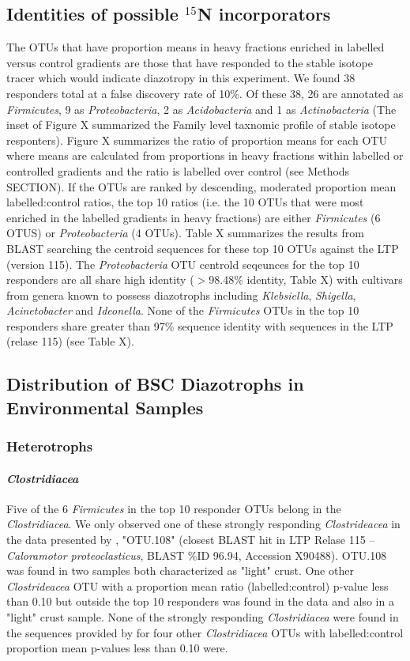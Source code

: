 \subsection{Identities of possible $^{15}$N incorporators}
The OTUs that have proportion means in heavy fractions enriched in labelled versus control gradients are those that have responded to the stable isotope tracer which would indicate diazotropy in this experiment. We found 38 responders total at a false discovery rate of 10\%. Of these 38, 26 are annotated as \textit{Firmicutes}, 9 as \textit{Proteobacteria}, 2 as \textit{Acidobacteria} and 1 as \textit{Actinobacteria} (The inset of Figure X summarized the Family level taxnomic profile of stable isotope responters). Figure X summarizes the ratio of proportion means for each OTU where means are calculated from proportions in heavy fractions within labelled or controlled gradients and the ratio is labelled over control (see Methods SECTION). If the OTUs are ranked by descending, moderated proportion mean labelled:control ratios, the top 10 ratios (i.e. the 10 OTUs that were most enriched in the labelled gradients in heavy fractions) are either \textit{Firmicutes} (6 OTUS) or \textit{Proteobacteria} (4 OTUs). Table X summarizes the results from BLAST searching the centroid sequences for these top 10 OTUs against the LTP (version 115). The \textit{Proteobacteria} OTU centrold seqeunces for the top 10 responders are all share high identity ($>$98.48\% identity, Table X) with cultivars from genera known to possess diazotrophs including \textit{Klebsiella}, \textit{Shigella}, \textit{Acinetobacter} and \textit{Ideonella}. None of the \textit{Firmicutes} OTUs in the top 10 responders share greater than 97\% sequence identity with sequences in the LTP (relase 115) (see Table X).

\subsection{Distribution of BSC Diazotrophs in Environmental Samples}
\subsubsection{Heterotrophs}
\paragraph{\textit{Clostridiacea}}
Five of the 6 \textit{Firmicutes} in the top 10 responder OTUs belong in the \textit{Clostridiacea}. We only observed one of these strongly responding \textit{Clostrideacea} in the data presented by \citet{Garcia_Pichel_2013}, "OTU.108" (closest BLAST hit in LTP Relase 115 -- \textit{Caloramotor proteoclasticus}, BLAST \%ID 96.94, Accession X90488). OTU.108 was found in two samples both characterized as "light" crust. One other \textit{Clostrideacea} OTU with a proportion mean ratio (labelled:control) p-value less than 0.10 but outside the top 10 responders was found in the \citet{Garcia_Pichel_2013} data and also in a "light" crust sample. None of the strongly responding \textit{Clostridiacea} were found in the sequences provided by \citet{Steven_2013} for four other \textit{Clostridiacea} OTUs with labelled:control proportion mean p-values less than 0.10 were.

